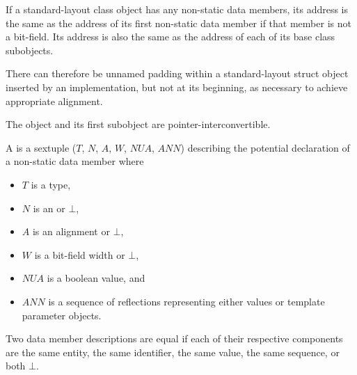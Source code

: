 \pnum
If a standard-layout class object has any non-static data members, its address
is the same as the address of its first non-static data member
if that member is not a bit-field. Its
address is also the same as the address of each of its base class subobjects.
\begin{note}
There can therefore be unnamed padding within a standard-layout struct object
inserted by an implementation, but
not at its beginning, as necessary to achieve appropriate alignment.
\end{note}
\begin{note}
The object and its first subobject are
pointer-interconvertible.
\end{note}

\pnum
A  is
a sextuple ($T$, $N$, $A$, $W$, $\mathit{NUA}$, $\mathit{ANN}$)
describing the potential declaration of a non-static data member where
\begin{itemize}
\item $T$ is a type,
\item $N$ is an  or $\bot$,
\item $A$ is an alignment or $\bot$,
\item $W$ is a bit-field width or $\bot$,
\item $\mathit{NUA}$ is a boolean value, and
\item $\mathit{ANN}$ is a sequence of reflections
representing either values or template parameter objects.
\end{itemize}
Two data member descriptions are equal
if each of their respective components are
the same entity,
the same identifier,
the same value,
the same sequence, or
both $\bot$.
